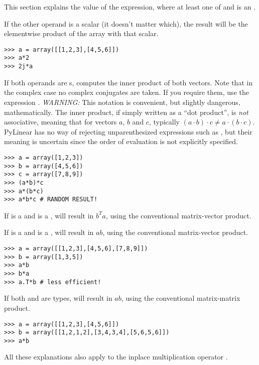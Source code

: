 This section explains the value of the expression, where at
least one of  and  is an .

If the other operand is a scalar (it doesn't matter which), the
result will be the elementwise product of the array with that scalar.
\begin{verbatim}
>>> a = array([[1,2,3],[4,5,6]])
>>> a*2
>>> 2j*a
\end{verbatim}

If both operands are s,  computes the inner
product of both vectors. Note that in the complex case no complex
conjugates are taken. If you require them, use the expression
. \emph{WARNING:} This notation is convenient, but
slightly dangerous, mathematically. The inner product, if simply
written as a ``dot product'', is \emph{not} associative, meaning that
for vectors $a$, $b$ and $c$, typically $(a\cdot b)\cdot
c\not=a\cdot(b\cdot c)$.  PyLinear has no way of rejecting
unparenthesized expressions such as , but their meaning is
uncertain since the order of evaluation is not explicitly specified.

\begin{verbatim}
>>> a = array([1,2,3])
>>> b = array([4,5,6])
>>> c = array([7,8,9])
>>> (a*b)*c
>>> a*(b*c)
>>> a*b*c # RANDOM RESULT!
\end{verbatim}

If  is a  and  is a ,
 will result in $b^Ta$, using the conventional matrix-vector
product.

If  is a  and  is a ,
 will result in $a b$, using the conventional matrix-vector
product.

\begin{verbatim}
>>> a = array([[1,2,3],[4,5,6],[7,8,9]])
>>> b = array([1,3,5])
>>> a*b
>>> b*a
>>> a.T*b # less efficient!
\end{verbatim}

If both  and  are  types,
 will result in $a b$, using the conventional matrix-matrix
product.
\begin{verbatim}
>>> a = array([[1,2,3],[4,5,6]])
>>> b = array([[1,2,1,2],[3,4,3,4],[5,6,5,6]])
>>> a*b
\end{verbatim}

All these explanations also apply to the inplace multiplication
operator \code{*=}.

